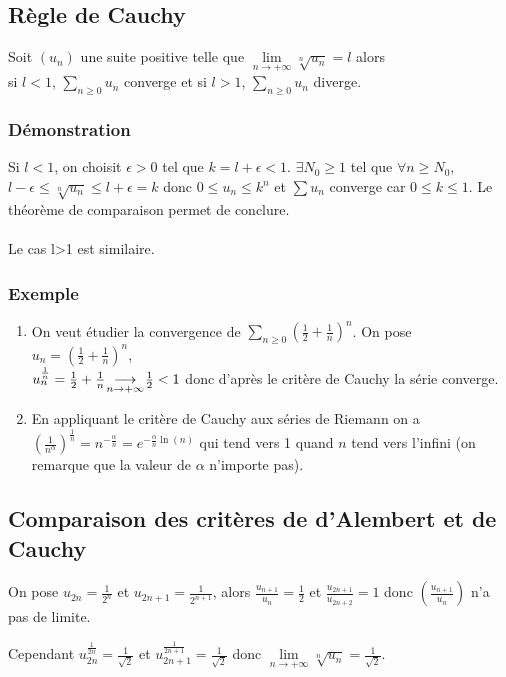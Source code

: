 \documentclass[a4paper,10pt]{book} %
\newcommand{\lime}[4]{#1\underset{\mathclap{#2 \rightarrow #3}}{\longrightarrow} #4}
\begin{document}
\subsection{Règle de Cauchy}
Soit $(u_n)$ une suite positive telle que $\lim\limits_{n\rightarrow+\infty}\sqrt[n]{u_n}=l$ alors\\si $l<1$, $\sum_{n\geq 0} u_n$ converge et si $l>1$, $\sum_{n\geq 0} u_n$ diverge.

\subsubsection{Démonstration}
Si $l<1$, on choisit $\epsilon>0$ tel que $k=l+\epsilon<1$. $\exists N_0\geq 1$ tel que $\forall n\geq N_0$, $l-\epsilon\leq \sqrt[n]{u_n}\leq l+\epsilon=k$ donc $0\leq u_n\leq k^n$ et $\sum u_n$ converge car $0\leq k\leq 1$. Le théorème de comparaison permet de conclure.\\\\
Le cas l>1 est similaire.

\subsubsection{Exemple}
\begin{enumerate}
\item On veut étudier la convergence de $\sum_{n\geq 0}(\frac{1}{2}+\frac{1}{n})^n$. On pose $u_n=(\frac{1}{2}+\frac{1}{n})^n$, \\
$u_n^{\frac{1}{n}}=\lime{\frac{1}{2}+\frac{1}{n}~}{n}{+\infty}{~\frac{1}{2}}<1$ donc d'après le critère de Cauchy la série converge.

\item En appliquant le critère de Cauchy aux séries de Riemann on a $(\frac{1}{n^\alpha})^{\frac{1}{n}}=n^{-\frac{\alpha}{n}}=e^{-\frac{\alpha}{n}\ln(n)}$ qui tend vers 1 quand $n$ tend vers l'infini (on remarque que la valeur de $\alpha$ n'importe pas).
\end{enumerate}

\subsection{Comparaison des critères de d'Alembert et de Cauchy}
On pose $u_{2n}=\frac{1}{2^n}$ et $u_{2n+1}=\frac{1}{2^{n+1}}$, alors
$\frac{u_{n+1}}{u_n}=\frac{1}{2}$ et $\frac{u_{2n+1}}{u_{2n+2}}=1$ donc $(\frac{u_{n+1}}{u_n})$ n'a pas de limite.

Cependant $u_{2n}^{\frac{1}{2n}}=\frac{1}{\sqrt{2}}$ et $u_{2n+1}^{\frac{1}{2n+1}}=\frac{1}{\sqrt{2}}$ donc $\lim\limits_{n\rightarrow+\infty} \sqrt[n]{u_n}=\frac{1}{\sqrt{2}}$.
\end{document}
